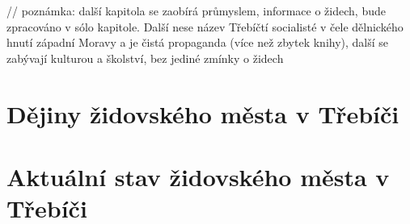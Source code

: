 \documentclass[a4paper,oneside,12p]{report}
\let\openright=\clearpage
\begin{document}
// poznámka: další kapitola se zaobírá průmyslem, informace o židech, bude zpracováno v sólo kapitole. Další nese název Třebíčtí socialisté v čele dělnického hnutí západní Moravy a je čistá propaganda (více než zbytek knihy), další se zabývají kulturou a školství, bez jediné zmínky o židech

\chapter{Dějiny židovského města v Třebíči}

\chapter{Aktuální stav židovského města v Třebíči}





\listoffigures
\openright
\end{document}
